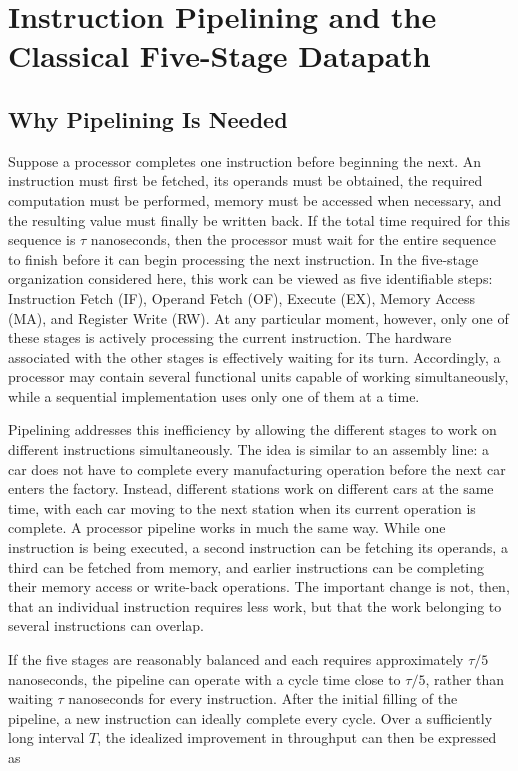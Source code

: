 \documentclass[12pt,a4paper]{report}
\begin{document}
\section{Instruction Pipelining and the Classical Five-Stage Datapath}
\label{sec:datapath}

\subsection{Why Pipelining Is Needed}

Suppose a processor completes one instruction before beginning the next. An instruction must first be fetched, its operands must be obtained, the required computation must be performed, memory must be accessed when necessary, and the resulting value must finally be written back. If the total time required for this sequence is $\tau$ nanoseconds, then the processor must wait for the entire sequence to finish before it can begin processing the next instruction. In the five-stage organization considered here, this work can be viewed as five identifiable steps: Instruction Fetch (IF), Operand Fetch (OF), Execute (EX), Memory Access (MA), and Register Write (RW). At any particular moment, however, only one of these stages is actively processing the current instruction. The hardware associated with the other stages is effectively waiting for its turn. Accordingly, a processor may contain several functional units capable of working simultaneously, while a sequential implementation uses only one of them at a time.

Pipelining addresses this inefficiency by allowing the different stages to work on different instructions simultaneously. The idea is similar to an assembly line: a car does not have to complete every manufacturing operation before the next car enters the factory. Instead, different stations work on different cars at the same time, with each car moving to the next station when its current operation is complete. A processor pipeline works in much the same way. While one instruction is being executed, a second instruction can be fetching its operands, a third can be fetched from memory, and earlier instructions can be completing their memory access or write-back operations. The important change is not, then, that an individual instruction requires less work, but that the work belonging to several instructions can overlap.

If the five stages are reasonably balanced and each requires approximately $\tau/5$ nanoseconds, the pipeline can operate with a cycle time close to $\tau/5$, rather than waiting $\tau$ nanoseconds for every instruction. After the initial filling of the pipeline, a new instruction can ideally complete every cycle. Over a sufficiently long interval $T$, the idealized improvement in throughput can then be expressed as
\end{document}
